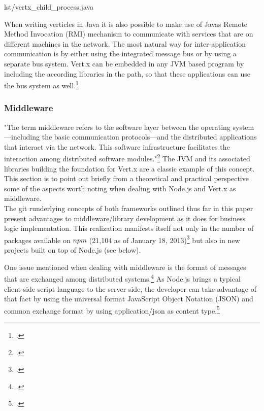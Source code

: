 %
{lst/vertx_child_process.java}

When writing verticles in Java it is also possible to make use of Javas Remote
Method Invocation (RMI) mechanism to communicate with services that are on different
machines in the network.
The most natural way for inter-application communication is by either using the
integrated message bus or by using a separate bus system.
Vert.x can be embedded in any JVM based program by including the according
libraries in the path, so that these applications can use the bus system as
well.\footcite[Cf.][]{vertx_2012}

\subsubsection{Middleware}
\label{middleware}
"The term middleware refers to the software layer between the operating system—including the basic communication protocols—and the distributed applications that interact via the network. This software infrastructure facilitates the
interaction among distributed software modules."\footcite[]{Geihs_2001} The JVM and its associated libraries building the foundation for Vert.x are a classic example of this concept. This section is to point out briefly from a theoretical and practical perspective some of the aspects worth noting when dealing with Node.js and Vert.x as middleware.\\

The git runderlying concepts of both frameworks outlined thus far in this paper present advantages to middleware/library development as it does for business logic implementation. This realization manifests itself not only in the number of packages available on $npm$ (21,104 as of January 18, 2013)\footcite[Cf.][]{node_packages} but also in new projects built on top of Node.js (see below).

One issue mentioned when dealing with middleware is the format of messages that are exchanged among distributed systems.\footcite[149]{Tannenbaum_2007} As Node.js brings a typical client-side script language to the server-side, the developer can take advantage of that fact by using the universal format JavaScript Object Notation (JSON) and common exchange format by using application/json as content type.\footcite[Cf.][]{rfc4627}\\

